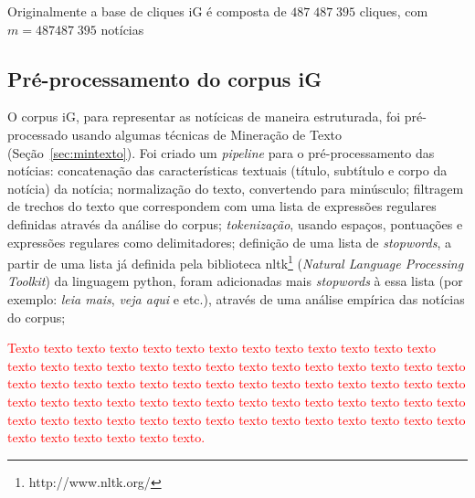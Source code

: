 \documentclass[normaltoc, espacoumemeio, pnumromarab,ruledheader]{abnt}
\begin{document}
Originalmente a base de cliques iG é composta de $487\;487\;395$ cliques, com $m = 487487\;395$ notícias

\subsection{Pré-processamento do corpus iG}


O corpus iG, para representar as notícicas de maneira estruturada, foi pré-processado usando algumas técnicas de Mineração de Texto (Seção~\ref{sec:mintexto}).
Foi criado um \textit{pipeline} para o pré-processamento das notícias: concatenação das características textuais (título, subtítulo e corpo da notícia) da notícia; normalização do texto, convertendo para minúsculo; filtragem de trechos do texto que correspondem com uma lista de expressões regulares definidas através da análise do corpus; \textit{tokenização}, usando espaços, pontuações e expressões regulares como delimitadores; definição de uma lista de \textit{stopwords}, a partir de uma lista já definida pela biblioteca nltk\footnote{http://www.nltk.org/} (\textit{Natural Language Processing Toolkit}) da linguagem python, foram adicionadas mais \textit{stopwords} à essa lista (por exemplo: \textit{leia mais}, \textit{veja aqui} e etc.), através de uma análise empírica das notícias do corpus; 

\textcolor{red}{Texto texto texto texto texto texto texto texto texto texto texto texto texto texto texto texto texto texto texto texto texto texto texto texto texto texto texto texto texto texto texto texto texto texto texto texto texto texto texto texto texto texto texto texto texto texto texto texto texto texto texto texto texto texto texto texto texto texto texto texto texto texto texto texto texto texto texto texto texto texto texto texto texto texto texto.}

\end{document}
